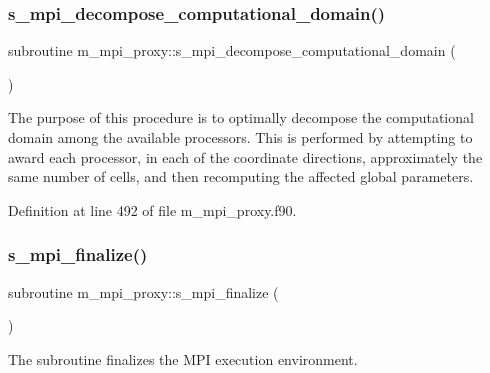 \mbox{\label{namespacem__mpi__proxy_a80c5e235786545276fe6ffa06965017f}} 
\subsubsection{\texorpdfstring{s\+\_\+mpi\+\_\+decompose\+\_\+computational\+\_\+domain()}{s\_mpi\_decompose\_computational\_domain()}}
{\footnotesize\ttfamily subroutine m\+\_\+mpi\+\_\+proxy\+::s\+\_\+mpi\+\_\+decompose\+\_\+computational\+\_\+domain (\begin{DoxyParamCaption}{ }\end{DoxyParamCaption})}



The purpose of this procedure is to optimally decompose the computational domain among the available processors. This is performed by attempting to award each processor, in each of the coordinate directions, approximately the same number of cells, and then recomputing the affected global parameters. 



Definition at line 492 of file m\+\_\+mpi\+\_\+proxy.\+f90.

\mbox{\label{namespacem__mpi__proxy_a43fbda10c02ec8bc1fc572c83090f2e5}} 
\subsubsection{\texorpdfstring{s\+\_\+mpi\+\_\+finalize()}{s\_mpi\_finalize()}}
{\footnotesize\ttfamily subroutine m\+\_\+mpi\+\_\+proxy\+::s\+\_\+mpi\+\_\+finalize (\begin{DoxyParamCaption}{ }\end{DoxyParamCaption})}



The subroutine finalizes the M\+PI execution environment. 



